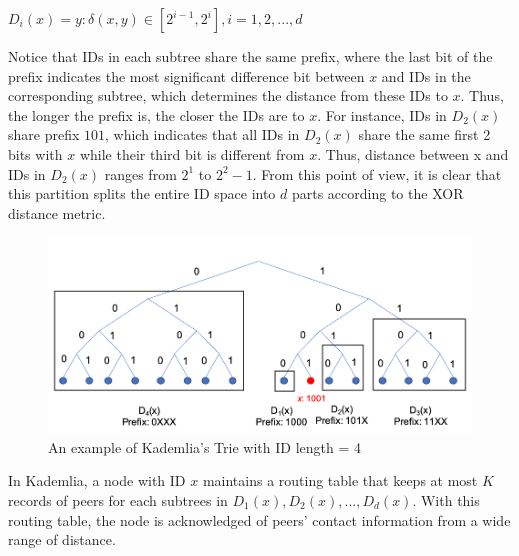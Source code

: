 \begin{center}
  $D_{i}(x) = {y: \delta(x,y) \in [2^{i-1}, 2^{i}]}, i = 1, 2, ..., d$
\end{center}

Notice that IDs in each subtree share the same prefix, where the last bit of the prefix indicates the most significant difference bit between $x$ and IDs in the corresponding subtree, which determines the distance from these IDs to $x$. Thus, the longer the prefix is, the closer the IDs are to $x$. For instance, IDs in $D_{2}(x)$ share prefix $101$, which indicates that all IDs in $D_{2}(x)$ share the same first 2 bits with $x$ while their third bit is different from $x$. Thus, distance between x and IDs in $D_{2}(x)$ ranges from $2^{1}$ to $2^{2}-1$. From this point of view, it is clear that this partition splits the entire ID space into $d$ parts according to the XOR distance metric.

\begin{figure}[hbt]
  \centering
    \includegraphics[width=13cm]{figures/bucket_trie.png}
    \caption{An example of Kademlia's Trie with ID length = 4}
    \label{fig:buckettrie}
\end{figure}

In Kademlia, a node with ID $x$ maintains a routing table that keeps at most $K$ records of peers for each subtrees in $D_{1}(x), D_{2}(x), ..., D_{d}(x)$. With this routing table, the node is acknowledged of peers' contact information from a wide range of distance.

